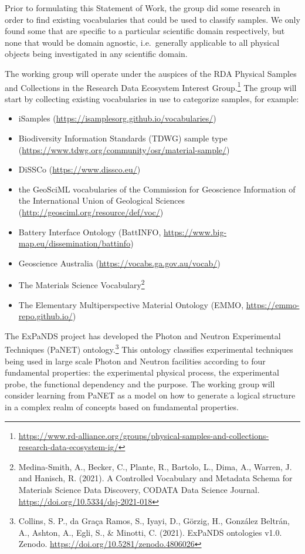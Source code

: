\documentclass{scrartcl}
\begin{document}
Prior to formulating this Statement of Work, the group did some
research in order to find existing vocabularies that could be used to
classify samples.  We only found some that are specific to a
particular scientific domain respectively, but none that would be
domain agnostic, i.e.\ generally applicable to all physical objects
being investigated in any scientific domain.

The working group will operate under the auspices of the RDA Physical
Samples and Collections in the Research Data Ecosystem Interest
Group.\footnote{\url{https://www.rd-alliance.org/groups/physical-samples-and-collections-research-data-ecosystem-ig/}}
The group will start by collecting existing vocabularies in use to
categorize samples, for example:
\begin{itemize}
\item iSamples (\url{https://isamplesorg.github.io/vocabularies/})
\item Biodiversity Information Standards (TDWG) sample type
  (\url{https://www.tdwg.org/community/osr/material-sample/})
\item DiSSCo (\url{https://www.dissco.eu/})
\item the GeoSciML vocabularies of the Commission for Geoscience
  Information of the International Union of Geological Sciences
  (\url{http://geosciml.org/resource/def/voc/})
\item Battery Interface Ontology (BattINFO,
  \url{https://www.big-map.eu/dissemination/battinfo})
\item Geoscience Australia (\url{https://vocabs.ga.gov.au/vocab/})
\item The Materials Science Vocabulary\footnote{Medina-Smith, A.,
    Becker, C., Plante, R., Bartolo, L., Dima, A., Warren, J. and
    Hanisch, R. (2021).  A Controlled Vocabulary and Metadata Schema
    for Materials Science Data Discovery, CODATA Data Science Journal.
    \url{https://doi.org/10.5334/dsj-2021-018}}
\item The Elementary Multiperspective Material Ontology (EMMO,
  \url{https://emmo-repo.github.io/})
\end{itemize}

The ExPaNDS project has developed the Photon and Neutron Experimental
Techniques (PaNET) ontology.\footnote{Collins, S. P., da Graça Ramos,
  S., Iyayi, D., Görzig, H., González Beltrán, A., Ashton, A., Egli,
  S., \& Minotti, C. (2021). ExPaNDS ontologies
  v1.0. Zenodo. \url{https://doi.org/10.5281/zenodo.4806026}}
This ontology classifies experimental techniques being used in large
scale Photon and Neutron facilities according to four fundamental
properties: the experimental physical process, the experimental probe,
the functional dependency and the purpose.  The working group will
consider learning from PaNET as a model on how to generate a logical
structure in a complex realm of concepts based on fundamental
properties.
\end{document}
